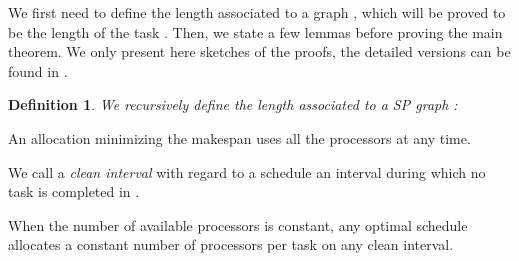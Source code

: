 \documentclass{llncs}
\newtheorem{defi}[theorem]{Definition}
\begin{document}
We first need to define the length  associated to a graph , which
will be proved to be the length of the task . Then, we state a few lemmas
before proving the main theorem. We only present here sketches of the proofs,
the detailed versions can be found in \cite{RR-ipdps-2014}.

\begin{defi}
\label{def.eq-task}
We recursively define the length  associated to a SP graph :
\begin{inparaitem}
	\item  \hfill 
	\item  \hfill
	\item 
\end{inparaitem}
\end{defi}

\newcommand{\Q}{\mathcal{Q}}



\begin{lemma}
  \label{lem:allproc}
  An allocation minimizing the makespan uses all the processors at any time. 
\end{lemma}



We call a \emph{clean interval} with regard to a schedule  an
interval during which no task is completed in .

\begin{lemma}
  \label{lem:esc}
  When the number of available processors is constant, any optimal schedule
  allocates a constant number of processors per task on any clean
  interval.
\end{lemma}
\end{document}
